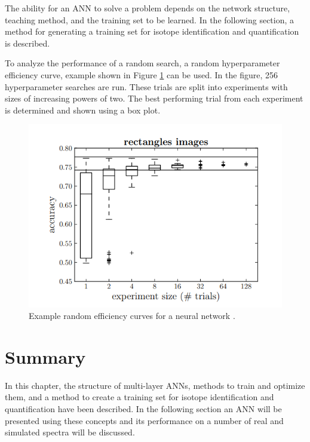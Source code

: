 The ability for an ANN to solve a problem depends on the network structure, teaching method, and the training set to be learned. In the following section, a method for generating a training set for isotope identification and quantification is described.

To analyze the performance of a random search, a random hyperparameter efficiency curve, example shown in Figure \ref{fig:Bergstra_random_efficiency_curve_DNN} can be used. In the figure, 256 hyperparameter searches are run. These trials are split into experiments with sizes of increasing powers of two. The best performing trial from each experiment is determined and shown using a box plot.


\begin{figure}[H]
	\centering
	\includegraphics[width=0.9\linewidth]{model_choice_hyperparameter_search_images/Bergstra12_random_efficiency_curve}
	\caption{Example random efficiency curves for a neural network \cite{Bergstra2012}.}
	\label{fig:Bergstra_random_efficiency_curve_DNN}
\end{figure}



\section{Summary}

In this chapter, the structure of multi-layer ANNs, methods to train and optimize them, and a method to create a training set for isotope identification and quantification have been described. In the following section an ANN will be presented using these concepts and its performance on a number of real and simulated spectra will be discussed. 










